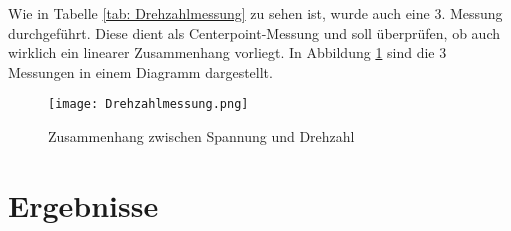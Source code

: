     \noindent
    Wie in Tabelle \ref{tab: Drehzahlmessung} zu sehen ist, wurde auch eine 3.
    Messung durchgeführt. Diese dient als Centerpoint-Messung und soll
    überprüfen, ob auch wirklich ein linearer Zusammenhang vorliegt. In Abbildung
    \ref{fig: Drehzahlmessung} sind die 3 Messungen in einem Diagramm dargestellt.

    \begin{figure}[H]
        \centering
        \texttt{[image: Drehzahlmessung.png]}
        \caption{Zusammenhang zwischen Spannung und Drehzahl}
        \label{fig: Drehzahlmessung}
    \end{figure}



\section{Ergebnisse}


